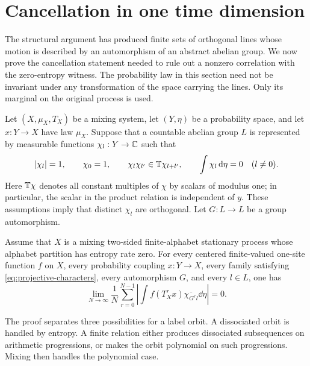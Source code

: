 \section{Cancellation in one time dimension}
\label{sec:cancellation}

The structural argument has produced finite sets of orthogonal lines whose
motion is described by an automorphism of an abstract abelian group.
We now prove the cancellation statement needed to rule out a nonzero
correlation with the zero-entropy witness. The probability law in this section
need not be invariant under any transformation of the space carrying the
lines. Only its marginal on the original process is used.

Let $(X,\mu_X,T_X)$ be a mixing system, let $(Y,\eta)$ be a probability
space, and let $x:Y\to X$ have law $\mu_X$. Suppose that a countable abelian
group $L$ is represented by measurable functions $\chi_l:Y\to\mathbb C$ such that
\begin{equation}
 \label{eq:projective-characters}
 |\chi_l|=1,\qquad \chi_0=1,\qquad
 \chi_l\chi_{l'}\in\mathbb T\chi_{l+l'},\qquad
 \int\chi_l\,\mathrm d\eta=0\quad(l\ne0).
\end{equation}
Here $\mathbb T\chi$ denotes all constant multiples of $\chi$ by scalars of
modulus one; in particular, the scalar in the product relation is independent
of $y$. These assumptions imply that distinct $\chi_l$ are orthogonal.
Let $G:L\to L$ be a group automorphism.

\begin{proposition}
\label{prop:orbit-cancellation}
Assume that $X$ is a mixing two-sided finite-alphabet stationary process whose
alphabet partition has entropy rate zero. For every centered finite-valued
one-site function $f$ on $X$, every probability coupling $x:Y\to X$, every
family satisfying \eqref{eq:projective-characters}, every automorphism $G$,
and every $l\in L$, one has
\begin{equation}
 \label{eq:orbit-cancellation}
 \lim_{N\to\infty}\frac1N\sum_{r=0}^{N-1}
 \left|\int f(T_X^r x)\overline{\chi_{G^r l}}\dd\eta\right|=0.
\end{equation}
\end{proposition}

The proof separates three possibilities for a label orbit. A dissociated
orbit is handled by entropy. A finite relation either produces dissociated
subsequences on arithmetic progressions, or makes the orbit polynomial on
such progressions. Mixing then handles the polynomial case.

